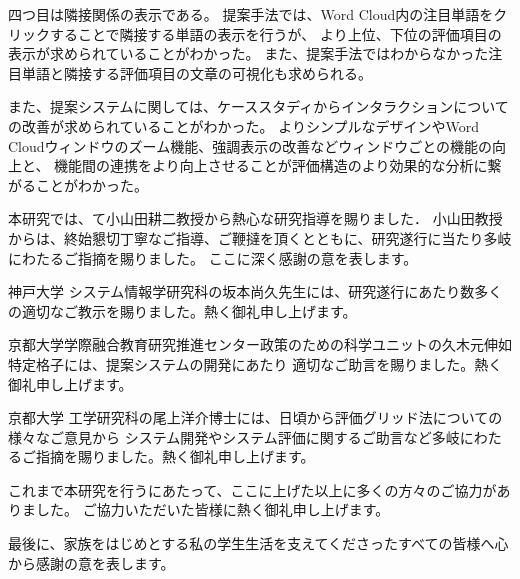 \documentclass[syuuron]{kuee}
\begin{document}
		四つ目は隣接関係の表示である。
		提案手法では、Word Cloud内の注目単語をクリックすることで隣接する単語の表示を行うが、
		より上位、下位の評価項目の表示が求められていることがわかった。
		また、提案手法ではわからなかった注目単語と隣接する評価項目の文章の可視化も求められる。
		
		また、提案システムに関しては、ケーススタディからインタラクションについての改善が求められていることがわかった。
		よりシンプルなデザインやWord Cloudウィンドウのズーム機能、強調表示の改善などウィンドウごとの機能の向上と、
		機能間の連携をより向上させることが評価構造のより効果的な分析に繋がることがわかった。

\begin{acknowledgements}
	本研究では、て小山田耕二教授から熱心な研究指導を賜りました．
	小山田教授からは、終始懇切丁寧なご指導、ご鞭撻を頂くとともに、研究遂行に当たり多岐にわたるご指摘を賜りました。
	ここに深く感謝の意を表します。
	
	神戸大学 システム情報学研究科の坂本尚久先生には、研究遂行にあたり数多くの適切なご教示を賜りました。熱く御礼申し上げます。
	
	京都大学学際融合教育研究推進センター政策のための科学ユニットの久木元伸如特定格子には、提案システムの開発にあたり
	適切なご助言を賜りました。熱く御礼申し上げます。
	
	京都大学 工学研究科の尾上洋介博士には、日頃から評価グリッド法についての様々なご意見から
	システム開発やシステム評価に関するご助言など多岐にわたるご指摘を賜りました。熱く御礼申し上げます。
	
	これまで本研究を行うにあたって、ここに上げた以上に多くの方々のご協力がありました。
	ご協力いただいた皆様に熱く御礼申し上げます。
	
	最後に、家族をはじめとする私の学生生活を支えてくださったすべての皆様へ心から感謝の意を表します。
	
\end{acknowledgements}
\end{document}
